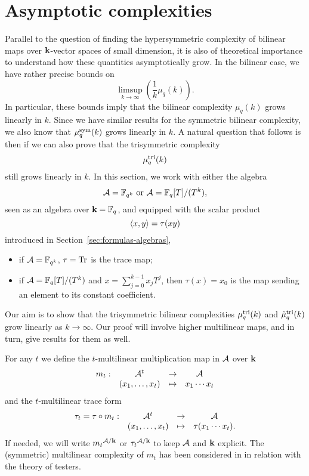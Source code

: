 \section{Asymptotic complexities}
\label{sec:asymptotic}

Parallel to the question of finding the hypersymmetric complexity of bilinear
maps over $\mathbf{k}$-vector spaces of small dimension, it is also of theoretical
importance to understand how these quantities asymptotically grow. In the
bilinear case, we have rather precise bounds on
\[
  \limsup_{k\to\infty}(\frac{1}{k}\mu_q(k)).
\]
In particular, these bounds imply that the bilinear complexity $\mu_q(k)$ grows
linearly in $k$. Since we have similar results for the symmetric bilinear
complexity, we also know that $\mu^{\textrm{sym}}_q(k)$ grows linearly in $k$. A natural
question that follows is then if we can also prove that the trisymmetric
complexity
\[
  \mu^{\textrm{tri}}_q(k)
\]
still grows linearly in $k$. In this section, we work with either the algebra 
\[
  \mathcal{A}=\mathbb{F}_{q^k}\text{ or }\mathcal{A}=\mathbb{F}_q[T]/(T^k),
\]
seen as an algebra over $\mathbf{k}=\mathbb{F}_q$, and
equipped with the scalar product 
\[
  \left\langle x,y\right\rangle = \tau(xy)
\]
introduced in
Section~\ref{sec:formulas-algebras}, \ie
\begin{itemize}
  \item if $\mathcal{A}=\mathbb{F}_{q^k}$, $\tau=\operatorname{Tr}$ is the trace map;
  \item if $\mathcal{A} = \mathbb{F}_{q}[T]/(T^k)$ and $x=\sum_{j=0}^{k-1}x_jT^j$, then
    $\tau(x) = x_0$ is the map sending an element to its constant coefficient.
\end{itemize}
Our aim is to show that the trisymmetric bilinear complexities $\mu^{\textrm{tri}}_q(k)$ and $\hat\mu^{\textrm{tri}}_q(k)$ grow linearly as $k\to\infty$.
Our proof will involve higher multilinear maps, and in turn, give results for them as well.

For any $t$ we define the $t$-multilinear multiplication map in $\mathcal{A}$ over $\mathbf{k}$
\[
\begin{array}{cccc}
m_t:&\mathcal{A}^t&\to&\mathcal{A}\\
&(x_1,\dots,x_t)&\mapsto&x_1\cdots x_t
\end{array}
\]
and the $t$-multilinear trace form
\[
\begin{array}{cccc}
\tau_t=\tau\circ m_t:&\mathcal{A}^t&\to&\mathcal{A}\\
&(x_1,\dots,x_t)&\mapsto&\tau(x_1\cdots x_t).
\end{array}
\]
If needed, we will write ${m_t}^{\mathcal{A}/\mathbf{k}}$ or ${\tau_t}^{\mathcal{A}/\mathbf{k}}$ to keep $\mathcal{A}$ and $\mathbf{k}$ explicit. 
The (symmetric) multilinear complexity of $m_t$ has been considered in \cite{Bshouty13} in relation with the theory of testers.

